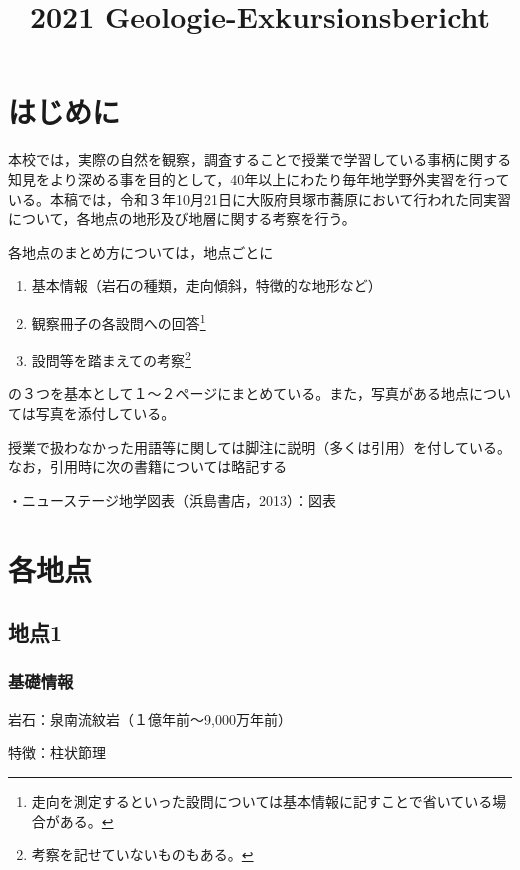 \documentclass[uplatex,b5paper]{jsreport}
\title{2021 Geologie-Exkursionsbericht}
\author{}
\date{}
\begin{document}
  \maketitle
  \tableofcontents
  \clearpage
  \chapter{はじめに}
    本校では，実際の自然を観察，調査することで授業で学習している事柄に関する知見をより深める事を目的として，40年以上にわたり毎年地学野外実習を行っている。本稿では，令和３年10月21日に大阪府貝塚市蕎原において行われた同実習について，各地点の地形及び地層に関する考察を行う。
    
    各地点のまとめ方については，地点ごとに
    \begin{enumerate}
      \item 基本情報（岩石の種類，走向傾斜，特徴的な地形など）
      \item 観察冊子の各設問への回答\footnote{走向を測定するといった設問については基本情報に記すことで省いている場合がある。}
      \item 設問等を踏まえての考察\footnote{考察を記せていないものもある。}
    \end{enumerate}
    の３つを基本として１～２ページにまとめている。また，写真がある地点については写真を添付している。

    授業で扱わなかった用語等に関しては脚注に説明（多くは引用）を付している。なお，引用時に次の書籍については略記する\par
    ・ニューステージ地学図表（浜島書店，2013）：図表

  \chapter{各地点}
  \clearpage

  \section{地点1}
    \subsection{基礎情報}
    岩石：泉南流紋岩（１億年前～9,000万年前）\par
    特徴：柱状節理\par
\end{document}
